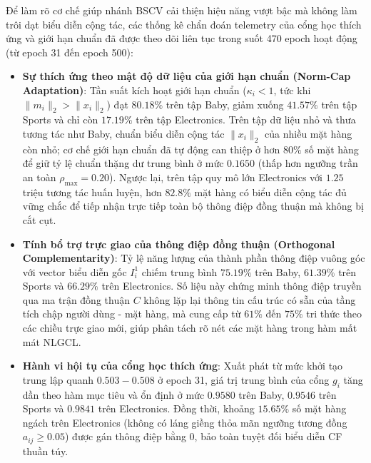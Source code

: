 Để làm rõ cơ chế giúp nhánh BSCV cải thiện hiệu năng vượt bậc mà không làm trôi dạt biểu diễn cộng tác, các thống kê chẩn đoán telemetry của cổng học thích ứng và giới hạn chuẩn đã được theo dõi liên tục trong suốt 470 epoch hoạt động (từ epoch 31 đến epoch 500):
\begin{itemize}
    \item \textbf{Sự thích ứng theo mật độ dữ liệu của giới hạn chuẩn (Norm-Cap Adaptation)}: Tần suất kích hoạt giới hạn chuẩn ($\kappa_i < 1$, tức khi $\|m_i\|_2 > \|x_i\|_2$) đạt $80.18\%$ trên tập Baby, giảm xuống $41.57\%$ trên tập Sports và chỉ còn $17.19\%$ trên tập Electronics. Trên tập dữ liệu nhỏ và thưa tương tác như Baby, chuẩn biểu diễn cộng tác $\|x_i\|_2$ của nhiều mặt hàng còn nhỏ; cơ chế giới hạn chuẩn đã tự động can thiệp ở hơn $80\%$ số mặt hàng để giữ tỷ lệ chuẩn thặng dư trung bình ở mức $0.1650$ (thấp hơn ngưỡng trần an toàn $\rho_{\max} = 0.20$). Ngược lại, trên tập quy mô lớn Electronics với $1.25$ triệu tương tác huấn luyện, hơn $82.8\%$ mặt hàng có biểu diễn cộng tác đủ vững chắc để tiếp nhận trực tiếp toàn bộ thông điệp đồng thuận mà không bị cắt cụt.
    \item \textbf{Tính bổ trợ trực giao của thông điệp đồng thuận (Orthogonal Complementarity)}: Tỷ lệ năng lượng của thành phần thông điệp vuông góc với vector biểu diễn gốc $I_i^1$ chiếm trung bình $75.19\%$ trên Baby, $61.39\%$ trên Sports và $66.29\%$ trên Electronics. Số liệu này chứng minh thông điệp truyền qua ma trận đồng thuận $C$ không lặp lại thông tin cấu trúc có sẵn của tầng tích chập người dùng - mặt hàng, mà cung cấp từ $61\%$ đến $75\%$ tri thức theo các chiều trực giao mới, giúp phân tách rõ nét các mặt hàng trong hàm mất mát NLGCL.
    \item \textbf{Hành vi hội tụ của cổng học thích ứng}: Xuất phát từ mức khởi tạo trung lập quanh $0.503 - 0.508$ ở epoch 31, giá trị trung bình của cổng $g_i$ tăng dần theo hàm mục tiêu và ổn định ở mức $0.9580$ trên Baby, $0.9546$ trên Sports và $0.9841$ trên Electronics. Đồng thời, khoảng $15.65\%$ số mặt hàng ngách trên Electronics (không có láng giềng thỏa mãn ngưỡng tương đồng $a_{ij} \ge 0.05$) được gán thông điệp bằng 0, bảo toàn tuyệt đối biểu diễn CF thuần túy.
\end{itemize}

